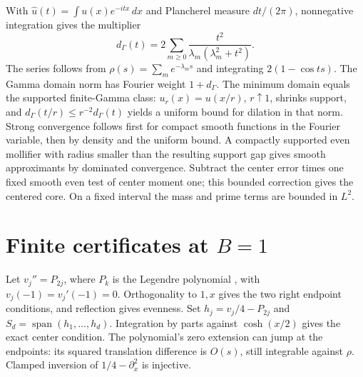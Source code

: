 \documentclass[11pt]{article}
\begin{document}
With $\widehat u(t)=\int u(x)e^{-itx}\,dx$ and Plancherel measure $dt/(2\pi)$, nonnegative integration gives the multiplier
\[
 d_\Gamma(t)=2\sum_{m\ge0}\frac{t^2}{\lambda_m(\lambda_m^2+t^2)}.
\]
The series follows from $\rho(s)=\sum_m e^{-\lambda_ms}$ and integrating $2(1-\cos ts)$. The Gamma domain norm has Fourier weight $1+d_\Gamma$. The minimum domain equals the supported finite-Gamma class: $u_r(x)=u(x/r)$, $r\uparrow1$, shrinks support, and $d_\Gamma(t/r)\le r^{-2}d_\Gamma(t)$ yields a uniform bound for dilation in that norm. Strong convergence follows first for compact smooth functions in the Fourier variable, then by density and the uniform bound. A compactly supported even mollifier with radius smaller than the resulting support gap gives smooth approximants by dominated convergence. Subtract the center error times one fixed smooth even test of center moment one; this bounded correction gives the centered core. On a fixed interval the mass and prime terms are bounded in $L^2$.

\section[Finite certificates at B=1]{Finite certificates at $B=1$}
Let $v_j''=P_{2j}$, where $P_k$ is the Legendre polynomial \cite{dlmflegendre}, with $v_j(-1)=v_j'(-1)=0$. Orthogonality to $1,x$ gives the two right endpoint conditions, and reflection gives evenness. Set $h_j=v_j/4-P_{2j}$ and $S_d=\operatorname{span}(h_1,\ldots,h_d)$. Integration by parts against $\cosh(x/2)$ gives the exact center condition. The polynomial's zero extension can jump at the endpoints: its squared translation difference is $O(s)$, still integrable against $\rho$. Clamped inversion of $1/4-\partial_x^2$ is injective.
\end{document}
